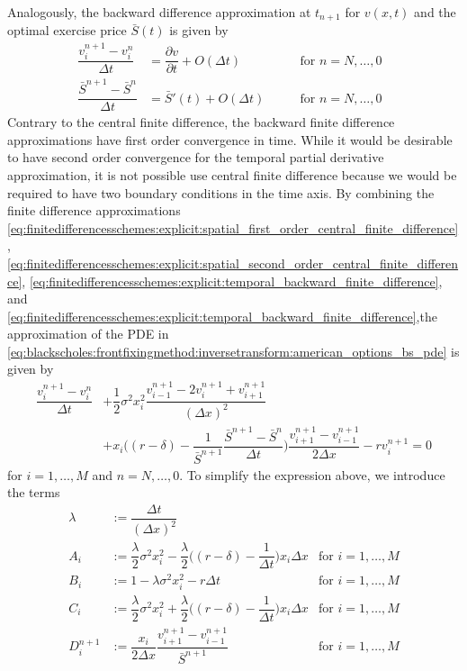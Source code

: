 Analogously, the backward difference approximation at $t_{n+1}$ for $v(x, t)$ and the optimal exercise price $\bar{S}(t)$ is given by
\begin{align}
  \label{eq:finitedifferencesschemes:explicit:temporal_backward_finite_difference}
  \dfrac{v^{n+1}_{i} - v^{n}_{i}}{\Delta{t}} &= \dfrac{\partial{v}}{\partial{t}}+ O(\Delta{t}) \qquad & \text{for $n = N,\dots,0$ } \\
  \label{eq:finitedifferencesschemes:explicit:front_temporal_backward_finite_difference}
  \dfrac{\bar{S}^{n+1}-\bar{S}^{n}}{\Delta t} &= \bar{S}'(t) + O(\Delta{t}) \qquad & \text{for $n = N,\dots,0$ }
\end{align}
Contrary to the central finite difference, the backward finite difference approximations have first order convergence in time. While it would be desirable to have second order convergence for the temporal partial derivative approximation, it is not possible use central finite difference because we would be required to have two boundary conditions in the time axis. By combining the finite difference approximations \eqref{eq:finitedifferencesschemes:explicit:spatial_first_order_central_finite_difference}, \eqref{eq:finitedifferencesschemes:explicit:spatial_second_order_central_finite_difference}, \eqref{eq:finitedifferencesschemes:explicit:temporal_backward_finite_difference}, and \eqref{eq:finitedifferencesschemes:explicit:temporal_backward_finite_difference},the approximation of the PDE in \eqref{eq:blackscholes:frontfixingmethod:inversetransform:american_options_bs_pde} is given by 
\begin{equation*}
  \begin{split}
    \dfrac{v^{n+1}_{i} - v^{n}_{i}}{\Delta{t}} & + \dfrac{1}{2}\sigma^2 x_i^2 \dfrac{v^{n+1}_{i-1} - 2v^{n+1}_{i} + v^{n+1}_{i+1}}{(\Delta{x})^2} \\ 
     & + x_i\bigg( (r-\delta) - \dfrac{1}{\bar{S}^{n+1}}\dfrac{\bar{S}^{n+1} - \bar{S}^{n}}{\Delta{t}} \bigg)\dfrac{v^{n+1}_{i+1} - v^{n+1}_{i-1}}{2\Delta{x}} - rv^{n+1}_{i} = 0
  \end{split}
\end{equation*}
for $i = 1, \dots, M$ and $n = N, \dots, 0$. To simplify the expression above, we introduce the terms 
\begin{align*}
  \lambda &:= \dfrac{\Delta{t}}{(\Delta{x})^2} \\
  A_i &:= \dfrac{\lambda}{2}\sigma^2x^{2}_i - \dfrac{\lambda}{2}\bigg((r-\delta) - \dfrac{1}{\Delta{t}}\bigg)x_i\Delta{x} & \text{for $i = 1, \dots, M$} \\ 
  B_i &:= 1 - \lambda\sigma^2x_i^2 - r\Delta{t} & \text{for $i = 1, \dots, M$} \\
  C_i &:= \dfrac{\lambda}{2}\sigma^2x^{2}_i + \dfrac{\lambda}{2}\bigg((r-\delta) - \dfrac{1}{\Delta{t}}\bigg)x_i\Delta{x} &  \text{for $i = 1, \dots, M$} \\
  D^{n+1}_{i} &:= \dfrac{x_i}{2\Delta{x}}\dfrac{v^{n+1}_{i+1} - v^{n+1}_{i-1}}{\bar{S}^{n+1}} &  \text{for $i = 1, \dots, M$}
\end{align*}
